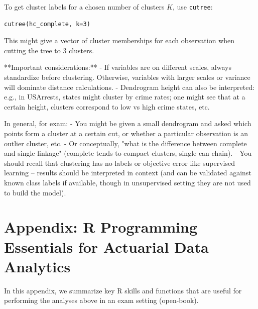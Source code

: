 \documentclass[11pt]{article}
\begin{document}
To get cluster labels for a chosen number of clusters $K$, use \texttt{cutree}:
\begin{verbatim}
cutree(hc_complete, k=3)
\end{verbatim}
This might give a vector of cluster memberships for each observation when cutting the tree to 3 clusters.

**Important considerations:**
- If variables are on different scales, always standardize before clustering. Otherwise, variables with larger scales or variance will dominate distance calculations.
- Dendrogram height can also be interpreted: e.g., in USArrests, states might cluster by crime rates; one might see that at a certain height, clusters correspond to low vs high crime states, etc.

In general, for exam:
- You might be given a small dendrogram and asked which points form a cluster at a certain cut, or whether a particular observation is an outlier cluster, etc.
- Or conceptually, "what is the difference between complete and single linkage" (complete tends to compact clusters, single can chain).
- You should recall that clustering has no labels or objective error like supervised learning – results should be interpreted in context (and can be validated against known class labels if available, though in unsupervised setting they are not used to build the model).

\appendix
\section{Appendix: R Programming Essentials for Actuarial Data Analytics}
In this appendix, we summarize key R skills and functions that are useful for performing the analyses above in an exam setting (open-book).
\end{document}
